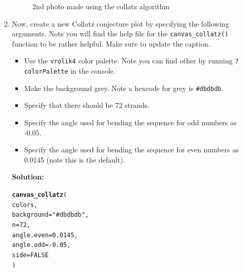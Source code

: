 \documentclass{article}\usepackage[]{graphicx}\usepackage[]{xcolor}
\makeatletter
\newcommand{\hlnum}[1]{\textcolor[rgb]{0.686,0.059,0.569}{#1}}%
\newcommand{\hlsng}[1]{\textcolor[rgb]{0.192,0.494,0.8}{#1}}%
\newcommand{\hlopt}[1]{\textcolor[rgb]{0,0,0}{#1}}%
\newcommand{\hldef}[1]{\textcolor[rgb]{0.345,0.345,0.345}{#1}}%
\newcommand{\hlkwc}[1]{\textcolor[rgb]{0.333,0.667,0.333}{#1}}%
\newcommand{\hlkwd}[1]{\textcolor[rgb]{0.737,0.353,0.396}{\textbf{#1}}}%
\newenvironment{kframe}{%
 \def\at@end@of@kframe{}%
 \ifinner\ifhmode%
  \def\at@end@of@kframe{\end{minipage}}%
  \begin{minipage}{\columnwidth}%
 \fi\fi%
 \def\FrameCommand##1{\hskip\@totalleftmargin \hskip-\fboxsep
 \colorbox{shadecolor}{##1}\hskip-\fboxsep
     \hskip-\linewidth \hskip-\@totalleftmargin \hskip\columnwidth}%
 \MakeFramed {\advance\hsize-\width
   \@totalleftmargin\z@ \linewidth\hsize
   \@setminipage}}%
 {\par\unskip\endMakeFramed%
 \at@end@of@kframe}
\newenvironment{knitrout}{}{} %
\makeatother
\begin{document}
\begin{enumerate}
\begin{enumerate}
\begin{figure}[H]
\begin{center}
\caption{2nd photo made using the collatz algorithm}
\label{CollatzPlot2}
\end{center}
\end{figure}
  \item Now, create a new Collatz conjecture plot by specifying the following 
  arguments. Note you will find the help file for the \texttt{canvas\_collatz()} 
  function to be rather helpful. Make sure to update the caption.
  \begin{itemize}
  \item Use the \texttt{vrolik4} color palette. Note you can find other by running 
  \texttt{?colorPalette} in the console.
  \item Make the background grey. Note a hexcode for grey is \texttt{\#dbdbdb}.
  \item Specify that there should be 72 strands.
  \item Specify the angle used for bending the sequence for odd numbers as -0.05.
  \item Specify the angle used for bending the sequence for even numbers as 0.0145 
  (note this is the default).
  \end{itemize}
\textbf{Solution:}
\begin{knitrout}\scriptsize
{}\color{fgcolor}\begin{kframe}
\begin{alltt}
\hlkwd{canvas_collatz}\hldef{(}
  \hldef{colors,}
  \hlkwc{background} \hldef{=} \hlsng{"#dbdbdb"}\hldef{,}
  \hlkwc{n} \hldef{=} \hlnum{72}\hldef{,}
  \hlkwc{angle.even} \hldef{=} \hlnum{0.0145}\hldef{,}
  \hlkwc{angle.odd} \hldef{=} \hlopt{-}\hlnum{0.05}\hldef{,}
  \hlkwc{side} \hldef{=} \hlnum{FALSE}
\hldef{)}
\end{alltt}
\end{kframe}
\end{knitrout}
\begin{figure}[H]
\begin{center}
\begin{knitrout}
\color{fgcolor}\begin{kframe}



\end{kframe}
\end{knitrout}
\end{center}
\end{figure}
\end{enumerate}
\end{enumerate}
\end{document}
